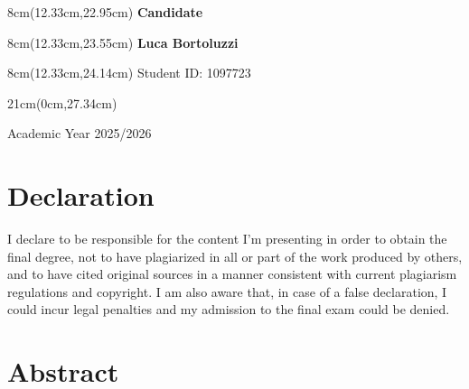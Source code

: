 \documentclass[a4paper,10pt,titlepage,twoside]{book}
\numberwithin{equation}{chapter}
\theoremstyle{plain}
\theoremstyle{definition}
\newcommand{\CandidateName}{Luca Bortoluzzi}
\newcommand{\StudentNumber}{Student ID: 1097723}
\newcommand{\AcademicYear}{2025/2026}
\begin{document}
\begin{textblock*}{8cm}(12.33cm,22.95cm)
    \noindent
    \textbf{Candidate}
\end{textblock*}
\begin{textblock*}{8cm}(12.33cm,23.55cm)
    \noindent
    \textbf{\CandidateName}
\end{textblock*}
\begin{textblock*}{8cm}(12.33cm,24.14cm)
    \noindent
    \StudentNumber
\end{textblock*}

\begin{textblock*}{21cm}(0cm,27.34cm)
    \centerline{Academic Year \AcademicYear}
\end{textblock*}

\endgroup

\clearpage
\thispagestyle{empty}
\null
\clearpage

\pagestyle{plain}
\hypersetup{pageanchor=true}

\frontmatter
{}

\chapter*{Declaration}
{}

I declare to be responsible for the content I'm presenting in order to obtain
the final degree, not to have plagiarized in all or part of the work produced
by others, and to have cited original sources in a manner consistent with
current plagiarism regulations and copyright. I am also aware that, in case
of a false declaration, I could incur legal penalties and my admission to the
final exam could be denied.

\chapter*{Abstract}
{}
\end{document}
